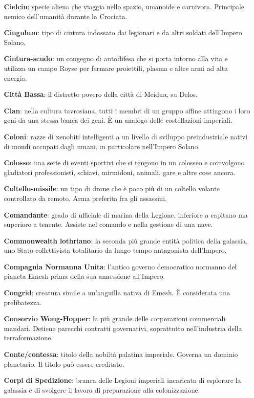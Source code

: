 \textbf{Cielcin}: specie aliena che viaggia nello spazio, umanoide e
carnivora. Principale nemico dell'umanità durante la Crociata.

\textbf{Cingulum}: tipo di cintura indossato dai legionari e da altri
soldati dell'Impero Solano.

\textbf{Cintura-scudo}: un congegno di autodifesa che si porta intorno
alla vita e utilizza un campo Royse per fermare proiettili, plasma e
altre armi ad alta energia.

\textbf{Città Bassa}: il distretto povero della città di Meidua, su
Delos.

\textbf{Clan}: nella cultura tavrosiana, tutti i membri di un gruppo
affine attingono i loro geni da una stessa banca dei geni. È un analogo
delle costellazioni imperiali.

\textbf{Coloni}: razze di xenobiti intelligenti a un livello di sviluppo
preindustriale nativi di mondi occupati dagli umani, in particolare
nell'Impero Solano.

\textbf{Colosso}: una serie di eventi sportivi che si tengono in un
colosseo e coinvolgono gladiatori professionisti, schiavi, mirmidoni,
animali, gare e altre cose ancora.

\textbf{Coltello-missile}: un tipo di drone che è poco più di un
coltello volante controllato da remoto. Arma preferita fra gli
assassini.

\textbf{Comandante}: grado di ufficiale di marina della Legione,
inferiore a capitano ma superiore a tenente. Assiste nel comando e nella
gestione di una nave.

\textbf{Commonwealth lothriano}: la seconda più grande entità politica
della galassia, uno Stato collettivista totalitario da lungo tempo
antagonista dell'Impero.

\textbf{Compagnia Normanna Unita}: l'antico governo democratico normanno
del pianeta Emesh prima della sua annessione all'Impero.

\textbf{Congrid}: creatura simile a un'anguilla nativa di Emesh. È
considerata una prelibatezza.

\textbf{Consorzio Wong-Hopper}: la più grande delle corporazioni
commerciali mandari. Detiene parecchi contratti governativi, soprattutto
nell'industria della terraformazione.

\textbf{Conte/contessa}: titolo della nobiltà palatina imperiale.
Governa un dominio planetario. Il titolo può essere ereditato.

\textbf{Corpi di Spedizione}: branca delle Legioni imperiali incaricata
di esplorare la galassia e di svolgere il lavoro di preparazione alla
colonizzazione.

